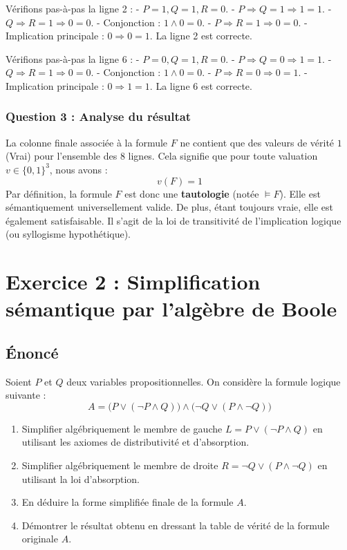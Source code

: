 \documentclass[11pt,a4paper]{article}
\begin{document}
Vérifions pas-à-pas la ligne 2 : - \(P=1, Q=1, R=0\). -
\(P \Rightarrow Q = 1 \Rightarrow 1 = 1\). -
\(Q \Rightarrow R = 1 \Rightarrow 0 = 0\). - Conjonction :
\(1 \land 0 = 0\). - \(P \Rightarrow R = 1 \Rightarrow 0 = 0\). -
Implication principale : \(0 \Rightarrow 0 = 1\). La ligne 2 est
correcte.

Vérifions pas-à-pas la ligne 6 : - \(P=0, Q=1, R=0\). -
\(P \Rightarrow Q = 0 \Rightarrow 1 = 1\). -
\(Q \Rightarrow R = 1 \Rightarrow 0 = 0\). - Conjonction :
\(1 \land 0 = 0\). - \(P \Rightarrow R = 0 \Rightarrow 0 = 1\). -
Implication principale : \(0 \Rightarrow 1 = 1\). La ligne 6 est
correcte.

\hypertarget{question-3-analyse-du-ruxe9sultat}{%
\subsubsection{Question 3 : Analyse du
résultat}\label{question-3-analyse-du-ruxe9sultat}}

La colonne finale associée à la formule \(F\) ne contient que des
valeurs de vérité \(1\) (Vrai) pour l'ensemble des \(8\) lignes. Cela
signifie que pour toute valuation \(v \in \{0, 1\}^3\), nous avons :
\[v(F) = 1\] Par définition, la formule \(F\) est donc une
\textbf{tautologie} (notée \(\models F\)). Elle est sémantiquement
universellement valide. De plus, étant toujours vraie, elle est
également satisfaisable. Il s'agit de la loi de transitivité de
l'implication logique (ou syllogisme hypothétique).
\n
\hypertarget{exercice-2-simplification-suxe9mantique-par-lalguxe8bre-de-boole}{%
\section{Exercice 2 : Simplification sémantique par l'algèbre de
Boole}\label{exercice-2-simplification-suxe9mantique-par-lalguxe8bre-de-boole}}

\hypertarget{uxe9noncuxe9}{%
\subsection{Énoncé}\label{uxe9noncuxe9}}

Soient \(P\) et \(Q\) deux variables propositionnelles. On considère la
formule logique suivante :
\[A = \big( P \lor (\neg P \land Q) \big) \land \big( \neg Q \lor (P \land \neg Q) \big)\]

\begin{enumerate}
\def\labelenumi{\arabic{enumi}.}
\tightlist
\item
  Simplifier algébriquement le membre de gauche
  \(L = P \lor (\neg P \land Q)\) en utilisant les axiomes de
  distributivité et d'absorption.
\item
  Simplifier algébriquement le membre de droite
  \(R = \neg Q \lor (P \land \neg Q)\) en utilisant la loi d'absorption.
\item
  En déduire la forme simplifiée finale de la formule \(A\).
\item
  Démontrer le résultat obtenu en dressant la table de vérité de la
  formule originale \(A\).
\end{enumerate}
\end{document}
